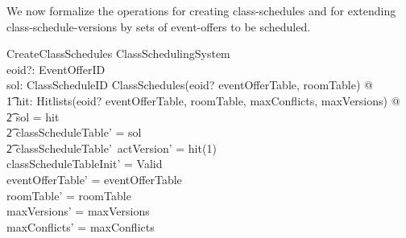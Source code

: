 \documentclass[a4paper]{article}
\begin{document}
\noindent
We now formalize the operations for creating class-schedules and for extending
class-schedule-versions by sets of event-offers to be scheduled.

\vspace{1ex}
\vspace{1ex}

\begin{schema}{CreateClassSchedules}
  \Delta ClassSchedulingSystem \\
  eoid?: \power EventOfferID \\
  \where
  \exists sol: ClassScheduleID \pfun ClassSchedules(eoid? \dres eventOfferTable,
  roomTable) @ \\ 
  \t1 \exists hit: Hitlists(eoid? \dres eventOfferTable, roomTable,
  maxConflicts, maxVersions) @ \\ 
  \t2 \ran sol = \ran hit \land \\
  \t2 classScheduleTable' = sol \land \\
  \t2 classScheduleTable'~actVersion' = hit(1) \\
  classScheduleTableInit' = Valid \\
  eventOfferTable' = eventOfferTable \\
  roomTable' = roomTable \\
  maxVersions' = maxVersions \\
  maxConflicts' = maxConflicts \\
\end{schema}
\end{document}
